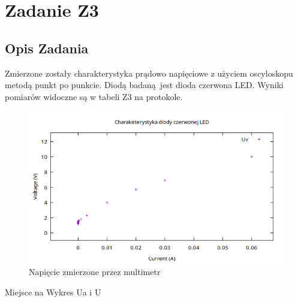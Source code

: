 \documentclass{article}
\begin{document}
\section{Zadanie Z3}
\centering
\subsection{Opis Zadania} 
Zmierzone zostały charakterystyka prądowo napięciowe z użyciem oscyloskopu metodą punkt po punkcie. 
Diodą badaną jest dioda czerwona LED. Wyniki pomiarów widoczne są w tabeli Z3 na protokole.
\begin{figure}[h]
\centering
  \includegraphics[scale=0.5]{./img/Z3_Uv.png}
  \caption{Napięcie zmierzone przez multimetr}
\end{figure}
Miejsce na Wykres Ua i U 
\end{document}
